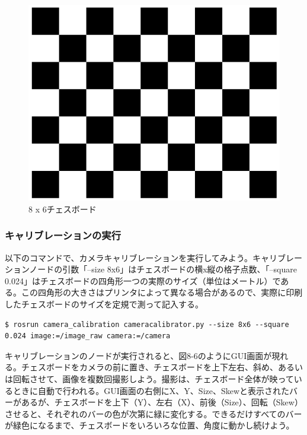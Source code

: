 \begin{figure}[htp]
  \centering
  \includegraphics[width=12cm]{pictures/chapter8/pic_08_05.png}
  \caption{8 x 6チェスボード}
\end{figure}

\subsubsection{キャリブレーションの実行}

以下のコマンドで、カメラキャリブレーションを実行してみよう。キャリブレーションノードの引数「--size 8x6」はチェスボードの横x縦の格子点数、「--square 0.024」はチェスボードの四角形一つの実際のサイズ（単位はメートル）である。この四角形の大きさはプリンタによって異なる場合があるので、実際に印刷したチェスボードのサイズを定規で測って記入する。

\begin{lstlisting}[language=ROS]
$ rosrun camera_calibration cameracalibrator.py --size 8x6 --square 0.024 image:=/image_raw camera:=/camera
\end{lstlisting}

キャリブレーションのノードが実行されると、図8-6のようにGUI画面が現れる。チェスボードをカメラの前に置き、チェスボードを上下左右、斜め、あるいは回転させて、画像を複数回撮影しよう。撮影は、チェスボード全体が映っているときに自動で行われる。GUI画面の右側にX、Y、Size、Skewと表示されたバーがあるが、チェスボードを上下（Y）、左右（X）、前後（Size）、回転（Skew）させると、それぞれのバーの色が次第に緑に変化する。できるだけすべてのバーが緑色になるまで、チェスボードをいろいろな位置、角度に動かし続けよう。

